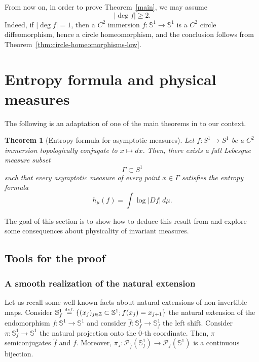 \documentclass[12pt,a4paper,twoside]{article}
\theoremstyle{plain}
\newtheorem{theorem}{Theorem}[section]
\theoremstyle{definition}
\newcommand{\Z}{{\mathbb Z}}
\newcommand{\cP}{{\mathcal P}}
\newcommand{\eqdef}{\stackrel{\scriptscriptstyle\textrm def.}{=}}
\begin{document}
From now on, in order to prove Theorem~\ref{main}, we may assume
\[
|\deg f|\ge2.
\]
Indeed, if \(|\deg f|=1\), then a \(C^2\) immersion
\(f:\mathbb S^1\to\mathbb S^1\) is a \(C^2\) circle diffeomorphism, hence a
circle homeomorphism, and the conclusion follows from
Theorem~\ref{thm:circle-homeomorphisms-low}.

\section{Entropy formula and physical measures}


The following is an adaptation of one of the main theorems in \cite{CYZ} to our context. 

\begin{theorem}[Entropy formula for asymptotic measures]
\label{thm:entropyfor}
Let $f:S^1\to S^1$ be a $C^2$ immersion topologically conjugate to $x\mapsto dx$. Then, there exists a full Lebesgue measure subset
\[
\Gamma\subset S^1
\]
such that every asymptotic measure of every point $x\in\Gamma$ satisfies the entropy formula
\[
h_\mu(f)=\int \log |Df|\,d\mu.
\]
\end{theorem}

The goal of this section is to show how to deduce this result from \cite{CYZ} and explore some consequences about physicality of invariant measures. 

\subsection{Tools for the proof}

\subsubsection{A smooth realization of the natural extension}

Let us recall some well-known facts about natural extensions of non-invertible maps. Consider $\mathbb{S}^1_f\eqdef\{(x_j)_{j\in\Z}\subset\mathbb{S}^1;f(x_j)=x_{j+1}\}$ the natural extension of the endomorphism $f:\mathbb{S}^1\to\mathbb{S}^1$ and consider $\hat{f}:\mathbb{S}_f^1\to\mathbb{S}_f^1$ the left shift. Consider $\pi:\mathbb{S}_f^1\to\mathbb{S}^1$ the natural projection onto the $0$-th coordinate. Then, $\pi$ semiconjugates $\hat{f}$ and $f$. Moreover, $\pi_{\star}:\cP_{\hat{f}}(\mathbb{S}^1_f)\to\cP_f(\mathbb{S}^1)$ is a continuous bijection.  
\end{document}
